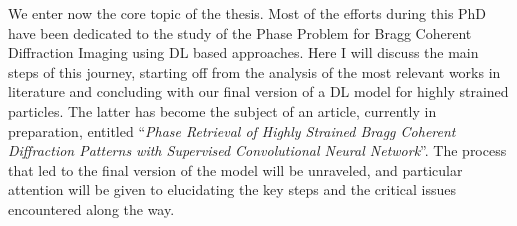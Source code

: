 

We enter now the core topic of the thesis. Most of the efforts during this PhD have been dedicated to the study of the Phase Problem 
for Bragg Coherent Diffraction Imaging using DL based approaches. Here I will discuss the main steps of this
journey, starting off from the analysis of the most relevant works in literature and concluding with our final version
of a DL model for highly strained particles. The latter has become the subject of an article, currently in preparation, 
entitled ``\textit{Phase Retrieval of Highly Strained Bragg Coherent Diffraction Patterns with Supervised Convolutional 
Neural Network}''. The process that led to the final version of the model will be unraveled, and particular attention
 will be given to elucidating the key steps and the critical issues encountered along the way. 

